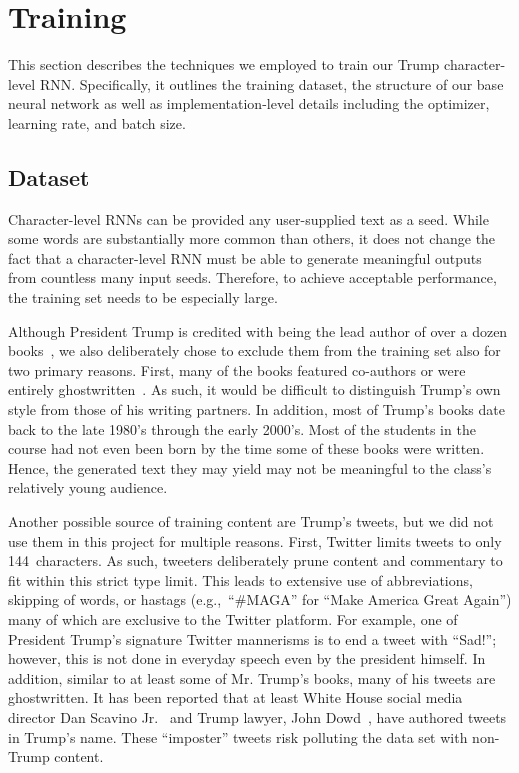 \documentclass{article}
\begin{document}
\section{Training}\label{sec:training}

This section describes the techniques we employed to train our Trump character-level RNN.  Specifically, it outlines the training dataset, the structure of our base neural network as well as implementation-level details including the optimizer, learning rate, and batch size.

\subsection{Dataset}

Character-level RNNs can be provided any user-supplied text as a seed.  While some words are substantially more common than others, it does not change the fact that a character-level RNN must be able to generate meaningful outputs from countless many input seeds. Therefore, to achieve acceptable performance, the training set needs to be especially large.

Although President Trump is credited with being the lead author of over a dozen books~\cite{trumpArtOfTheDeal,trumpSurvivingAtTheTop,trumpArtOfTheComeback,trumpTheAmericaWeDeserve,trumpHowToGetRich,trumpCrippledAmerica,trumpTimeToGetTough,trumpThinkBig,trump101,trumpNeverGiveUp,trumpWhyWeWantYou,trumpBestGolfAdvice,trumpMidasTouch}, we also deliberately chose to exclude them from the training set also for two primary reasons.  First, many of the books featured co-authors or were entirely ghostwritten~\cite{mayerNewYorkerGhostwriter}.  As such, it would be difficult to distinguish Trump's own style from those of his writing partners.  In addition, most of Trump's books date back to the late 1980's through the early 2000's.  Most of the students in the course had not even been born by the time some of these books were written. Hence, the generated text they may yield may not be meaningful to the class's relatively young audience.

Another possible source of training content are Trump's tweets, but we did not use them in this project for multiple reasons.  First, Twitter limits tweets to only 144~characters. As such, tweeters deliberately prune content and commentary to fit within this strict type limit.  This leads to extensive use of abbreviations, skipping of words, or hastags (e.g.,~``\#MAGA'' for ``Make America Great Again'') many of which are exclusive to the Twitter platform. For example, one of President Trump's signature Twitter mannerisms is to end a tweet with ``Sad!''; however, this is not done in everyday speech even by the president himself. In addition, similar to at least some of Mr. Trump's books, many of his tweets are ghostwritten.  It has been reported that at least White House social media director Dan Scavino Jr.~\cite{ohlheiser2017} and Trump lawyer, John Dowd~\cite{phillipsBlake2017}, have authored tweets in Trump's name.  These ``imposter'' tweets risk polluting the data set with non-Trump content.
\end{document}
